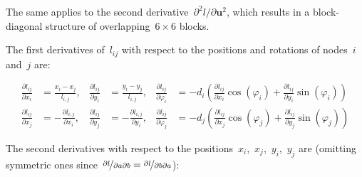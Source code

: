 The same applies to the second derivative~$\partial^2 l/\partial \boldsymbol{u}^2$, which results in a block-diagonal structure of overlapping~$6 \times 6$ blocks.

The first derivatives of~$l_{ij}$ with respect to the positions and rotations of nodes~$i$ and~$j$ are:


\begin{align}
\frac{\partial l_{ij}}{\partial x_i} &= \frac{x_i - x_j}{l_{i,j}} , & \frac{\partial l_{ij}}{\partial y_i} &= \frac{y_i - y_j}{l_{i,j}}, & \frac{\partial l_{ij}}{\partial \varphi_i} &= -d_{i}\left(\frac{\partial l_{ij}}{\partial x_i}\cos(\varphi_i) + \frac{\partial l_{ij}}{\partial y_i}\sin(\varphi_i)\right) \\
\frac{\partial l_{ij}}{\partial x_j} &= -\frac{\partial l_{i,j}}{\partial x_i}, & \frac{\partial l_{ij}}{\partial y_j} &= -\frac{\partial l_{i,j}}{\partial y_i}, & \frac{\partial l_{ij}}{\partial \varphi_j} &= -d_{j}\left(\frac{\partial l_{ij}}{\partial x_j}\cos(\varphi_j) + \frac{\partial l_{ij}}{\partial y_j}\sin(\varphi_j)\right)
\end{align}

\newpage
The second derivatives with respect to the positions~$x_i$,~$x_j$,~$y_i$,~$y_j$ are (omitting symmetric ones since~$\nicefrac{\partial l}{\partial a \partial b} = \nicefrac{\partial l}{\partial b \partial a}$):


